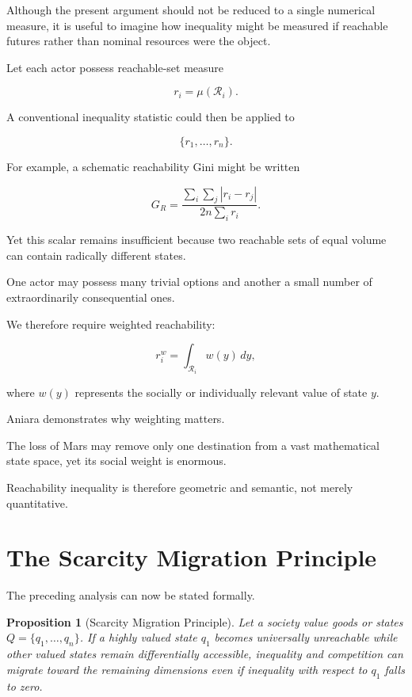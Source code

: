 \documentclass[11pt,oneside]{book}
\newtheorem{proposition}[theorem]{Proposition}
\theoremstyle{definition}
\theoremstyle{remark}
\newcommand{\R}{\mathcal{R}}
\begin{document}
Although the present argument should not be reduced to a single numerical measure, it is useful to imagine how inequality might be measured if reachable futures rather than nominal resources were the object.

Let each actor possess reachable-set measure

\[
r_i=\mu(\R_i).
\]

A conventional inequality statistic could then be applied to

\[
\{r_1,\ldots,r_n\}.
\]

For example, a schematic reachability Gini might be written

\[
G_R
=
\frac{
\sum_i\sum_j|r_i-r_j|
}{
2n\sum_i r_i
}.
\]

Yet this scalar remains insufficient because two reachable sets of equal volume can contain radically different states.

One actor may possess many trivial options and another a small number of extraordinarily consequential ones.

We therefore require weighted reachability:

\[
r_i^w
=
\int_{\R_i}
w(y)\,dy,
\]

where \(w(y)\) represents the socially or individually relevant value of state \(y\).

Aniara demonstrates why weighting matters.

The loss of Mars may remove only one destination from a vast mathematical state space, yet its social weight is enormous.

Reachability inequality is therefore geometric and semantic, not merely quantitative.

\section{The Scarcity Migration Principle}

The preceding analysis can now be stated formally.

\begin{proposition}[Scarcity Migration Principle]
Let a society value goods or states \(Q=\{q_1,\ldots,q_n\}\). If a highly valued state \(q_1\) becomes universally unreachable while other valued states remain differentially accessible, inequality and competition can migrate toward the remaining dimensions even if inequality with respect to \(q_1\) falls to zero.
\end{proposition}
\end{document}

